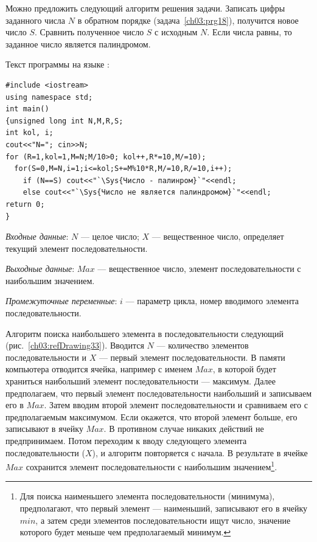 Можно предложить следующий алгоритм решения задачи. Записать цифры заданного числа $N$ в обратном
порядке (задача~\ref{ch03:prg18}), получится новое число $S$.
Сравнить полученное число $S$ с исходным $N$. Если числа равны,
то заданное число является палиндромом.

Текст программы на языке :
\begin{lstlisting}
#include <iostream>
using namespace std;
int main()
{unsigned long int N,M,R,S; 
int kol, i;
cout<<"N="; cin>>N;
for (R=1,kol=1,M=N;M/10>0; kol++,R*=10,M/=10);
  for(S=0,M=N,i=1;i<=kol;S+=M%10*R,M/=10,R/=10,i++);
    if (N==S) cout<<"`\Sys{Число - палинром}`"<<endl;
    else cout<<"`\Sys{Число не является палиндромом}`"<<endl;
return 0;
}
\end{lstlisting}



\emph{Входные данные}: $N$ --- целое число; $X$ --- вещественное число,
определяет текущий элемент последовательности.

\emph{Выходные данные}: $Max$ --- вещественное число, элемент последовательности с
наибольшим значением.

\emph{Промежуточные переменные}: $i$ --- параметр цикла, номер вводимого элемента
последовательности.

Алгоритм поиска наибольшего элемента в последовательности следующий (рис.~\ref{ch03:refDrawing33}). 
Вводится $N$ --- количество элементов последовательности и $X$ --- первый элемент последовательности. 
В памяти компьютера отводится ячейка, например с
именем $Max$, в которой будет храниться наибольший элемент последовательности --- максимум. Далее
предполагаем, что первый элемент последовательности наибольший и записываем его в $Max$. Затем
вводим второй элемент последовательности и сравниваем его с предполагаемым максимумом. Если окажется, что второй
элемент больше, его записывают в ячейку $Max$. В противном случае никаких действий не предпринимаем.
Потом переходим к вводу следующего элемента последовательности ($X$), и алгоритм повторяется с начала. В результате в
ячейке $Max$ сохранится элемент последовательности с наибольшим значением\footnote{Для поиска
наименьшего элемента последовательности (минимума), предполагают, что первый элемент --- наименьший, записывают его в
ячейку $min$, а затем среди элементов последовательности ищут число, значение которого будет меньше чем предполагаемый
минимум.}.

